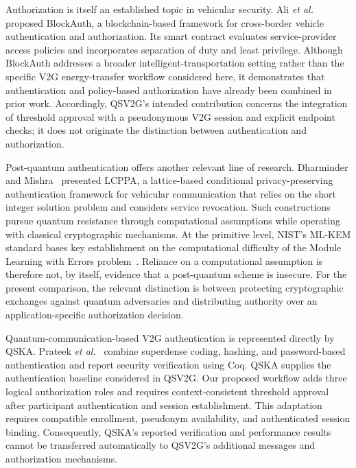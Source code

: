 \documentclass[twocolumn,10pt,journal]{IEEEtran}
\begin{document}
Authorization is itself an established topic in vehicular security. Ali \emph{et al.}~\cite{ali2023blockauth} proposed BlockAuth, a blockchain-based framework for cross-border vehicle authentication and authorization. Its smart contract evaluates service-provider access policies and incorporates separation of duty and least privilege. Although BlockAuth addresses a broader intelligent-transportation setting rather than the specific V2G energy-transfer workflow considered here, it demonstrates that authentication and policy-based authorization have already been combined in prior work. Accordingly, QSV2G's intended contribution concerns the integration of threshold approval with a pseudonymous V2G session and explicit endpoint checks; it does not originate the distinction between authentication and authorization.

Post-quantum authentication offers another relevant line of research. Dharminder and Mishra~\cite{dharminder2020lcppa} presented LCPPA, a lattice-based conditional privacy-preserving authentication framework for vehicular communication that relies on the short integer solution problem and considers service revocation. Such constructions pursue quantum resistance through computational assumptions while operating with classical cryptographic mechanisms. At the primitive level, NIST's ML-KEM standard bases key establishment on the computational difficulty of the Module Learning with Errors problem~\cite{nist2024mlkem}. Reliance on a computational assumption is therefore not, by itself, evidence that a post-quantum scheme is insecure. For the present comparison, the relevant distinction is between protecting cryptographic exchanges against quantum adversaries and distributing authority over an application-specific authorization decision.

Quantum-communication-based V2G authentication is represented directly by QSKA. Prateek \emph{et al.}~\cite{prateek2024qska} combine superdense coding, hashing, and password-based authentication and report security verification using Coq. QSKA supplies the authentication baseline considered in QSV2G. Our proposed workflow adds three logical authorization roles and requires context-consistent threshold approval after participant authentication and session establishment. This adaptation requires compatible enrollment, pseudonym availability, and authenticated session binding. Consequently, QSKA's reported verification and performance results cannot be transferred automatically to QSV2G's additional messages and authorization mechanisms.
\end{document}
